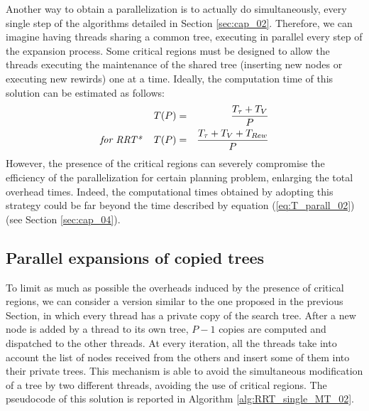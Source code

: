Another way to obtain a parallelization is to actually do simultaneously, every single step of the algorithms detailed in Section \ref{sec:cap_02}. Therefore, we can imagine having threads sharing a common tree, executing in parallel every step of the expansion process. Some critical regions must be designed to allow the threads executing the maintenance of the shared tree (inserting new nodes or executing new rewirds) one at a time.
Ideally, the computation time of this solution can be estimated as follows:
\begin{eqnarray}
T(P) &=& \frac{T_{\tau} + T_V }{P} \nonumber\\
\textit{for RRT*  \,\,\,\,\,} T(P) &=& \frac{T_{\tau} + T_V + T_{Rew} }{P}
\label{eq:T_parall_02}
\end{eqnarray}
However, the presence of the critical regions can severely compromise the efficiency of the parallelization for certain planning problem, enlarging the total overhead times. Indeed, the computational times obtained by adopting this strategy could be far beyond the time described by equation (\ref{eq:T_parall_02}) (see Section \ref{sec:cap_04}).

\subsection{Parallel expansions of copied trees}
\label{subsec:MT_03}

To limit as much as possible the overheads induced by the presence of critical regions, we can consider a version similar to the one proposed in the previous Section, in which every thread has a private copy of the search tree. After a new node is added by a thread to its own tree, $P-1$ copies are computed and dispatched to the other threads. At every iteration, all the threads take into account the list of nodes received from the others and insert some of them into their private trees. This mechanism is able to avoid the
simultaneous modification of a tree by two different threads, avoiding the use of critical regions. 
The pseudocode of this solution is reported in Algorithm \ref{alg:RRT_single_MT_02}.

